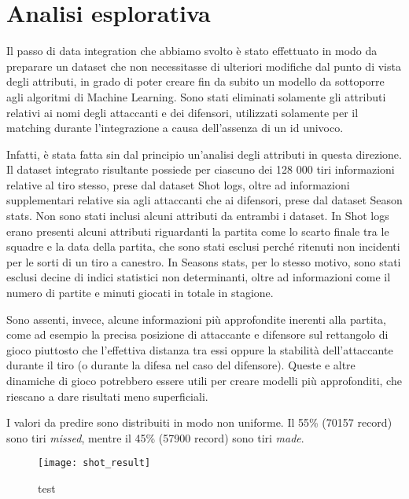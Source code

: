 \section{Analisi esplorativa}

Il passo di data integration che abbiamo svolto è stato effettuato in modo da preparare un dataset che non necessitasse di ulteriori modifiche dal punto di vista degli attributi, in grado di poter creare fin da subito un modello da sottoporre agli algoritmi di Machine Learning. Sono stati eliminati solamente gli attributi relativi ai nomi degli attaccanti e dei difensori, utilizzati solamente per il matching durante l’integrazione a causa dell’assenza di un id univoco.

\par
Infatti, è stata fatta sin dal principio un’analisi degli attributi in questa direzione. Il dataset integrato risultante possiede per ciascuno dei 128 000 tiri informazioni relative al tiro stesso, prese dal dataset Shot logs, oltre ad informazioni supplementari relative sia agli attaccanti che ai difensori, prese dal dataset Season stats. Non sono stati inclusi alcuni attributi da entrambi i dataset. In Shot logs erano presenti alcuni attributi riguardanti la partita come lo scarto finale tra le squadre e la data della partita, che sono stati esclusi perché ritenuti non incidenti per le sorti di un tiro a canestro. In Seasons stats, per lo stesso motivo, sono stati esclusi decine di indici statistici non determinanti, oltre ad informazioni come il numero di partite e minuti giocati in totale in stagione.

\par
Sono assenti, invece, alcune informazioni più approfondite inerenti alla partita, come ad esempio la precisa posizione di attaccante e difensore sul rettangolo di gioco piuttosto che l’effettiva distanza tra essi oppure la stabilità dell’attaccante durante il tiro (o durante la difesa nel caso del difensore). Queste e altre dinamiche di gioco potrebbero essere utili per creare modelli più approfonditi, che riescano a dare risultati meno superficiali.

\par
I valori da predire sono distribuiti in modo non uniforme. Il 55\% (70157 record) sono tiri \textit{missed}, mentre il 45\% (57900 record) sono tiri \textit{made}. 


\begin{figure}
\caption{test}
\fontsize{9pt}{1em}
	\texttt{[image: shot\_result]}
\end{figure}
